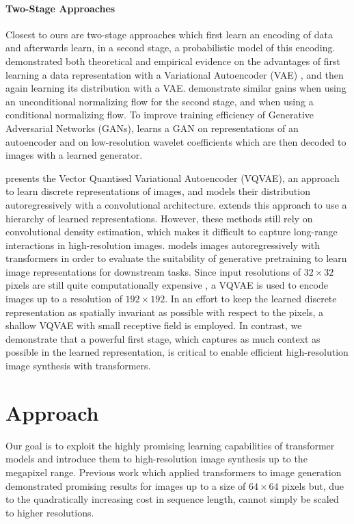 \documentclass[final]{cvpr}
\begin{document}
\paragraph{Two-Stage Approaches}
Closest to ours are two-stage approaches which first learn an encoding of data
and afterwards learn, in a second stage, a probabilistic model of this
encoding. \cite{dai2019diagnosing} demonstrated both theoretical and empirical
evidence on the advantages of first learning a data representation with a
Variational Autoencoder (VAE) \cite{vae,vae2}, and then again learning its
distribution with a VAE. \cite{esser2020invertible,xiao2019generative} demonstrate similar gains when using an
unconditional normalizing flow for the second stage, and \cite{rombach2020making,rombach2020network}
when using a conditional normalizing flow. To improve training efficiency of
Generative Adversarial Networks (GANs), \cite{liu2019acceleration} learns a
GAN \cite{gan} on representations of an
autoencoder and \cite{han2020notsobiggan} on low-resolution wavelet coefficients
which are then decoded to images with a learned generator.

\cite{oord2018neural} presents the Vector Quantised Variational Autoencoder (VQVAE), an
approach to learn discrete representations of images,
and models their distribution autoregressively with a convolutional
architecture. \cite{razavi2019generating} extends this approach to use a hierarchy of
learned representations. However, these methods still rely on
convolutional density estimation, which makes it difficult to capture
long-range interactions in high-resolution images.
%
\cite{chen2020generative} models images autoregressively with transformers in order to
evaluate the suitability of generative pretraining to learn image representations for downstream tasks. Since input resolutions of $32\times 32$ pixels
are still quite computationally expensive \cite{chen2020generative}, a VQVAE is used to
encode images up to a resolution of $192\times 192$. In an effort to keep the
learned discrete representation as spatially invariant as possible with respect
to the pixels, a shallow VQVAE with small receptive field is employed.
In contrast, we demonstrate that a powerful first stage, which captures as much
context as possible in the learned representation, is critical to enable
efficient high-resolution image synthesis with transformers.

\section{Approach}
\label{sec:approach} 
%
Our goal is to exploit the highly promising learning capabilities of
transformer models \cite{vaswani2017attention} and introduce them to high-resolution image
synthesis up to the megapixel range.
%
Previous work \cite{parmar2018image, chen2020generative} which applied transformers to
image generation demonstrated promising results for images up to a size of $64
\times 64$ pixels but, due to the quadratically increasing cost in sequence
length, cannot simply be scaled to higher resolutions. 
%
\end{document}
